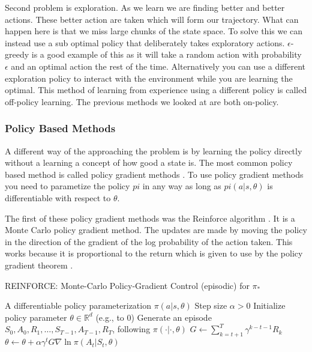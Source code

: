 Second problem is exploration. As we learn we are finding better and better actions. These better action are taken which will form our trajectory. What can happen here is that we miss large chunks of the state space. To solve this we can instead use a sub optimal policy that deliberately takes exploratory actions. $\epsilon$-greedy is a good example of this as it will take a random action with probability $\epsilon$ and an optimal action the rest of the time. Alternatively you can use a different exploration policy to interact with the environment while you are learning the optimal. This method of learning from experience using a different policy is called off-policy learning. The previous methods we looked at are both on-policy.

\subsubsection{Policy Based Methods}

A different way of the approaching the problem is by learning the policy directly without a learning a concept of how good a state is. The most common policy based method is called policy gradient methods \cite{suttonPolicyGradientMethods1999}. To use policy gradient methods you need to parametize the policy $pi$ in any way as long as $pi(a|s, \theta)$ is differentiable with respect to $\theta$.

The first of these policy gradient methods was the Reinforce algorithm \cite{williamsSimpleStatisticalGradientfollowing1992}. It is a Monte Carlo policy gradient method. The updates are made by moving the policy in the direction of the gradient of the log probability of the action taken. This works because it is proportional to the return which is given to use by the policy gradient theorem \cite{suttonPolicyGradientMethods1999}.

\begin{algorithm}
\caption{REINFORCE: Monte-Carlo Policy-Gradient Control (episodic) for $\pi_*$}
\begin{algorithmic}[1]
\Require A differentiable policy parameterization $\pi(a|s, \theta)$
\Require Step size $\alpha > 0$
\State Initialize policy parameter $\theta \in \mathbb{R}^d$ (e.g., to 0)
\Loop
  \State Generate an episode $S_0, A_0, R_1, \ldots, S_{T-1}, A_{T-1}, R_T$, following $\pi(\cdot|\cdot, \theta)$
    \State $G \leftarrow \sum_{k=t+1}^{T} \gamma^{k-t-1} R_k$
    \State $\theta \leftarrow \theta + \alpha \gamma^t G \nabla \ln \pi(A_t|S_t, \theta)$
  \EndFor
\EndLoop
\end{algorithmic}
\end{algorithm}

